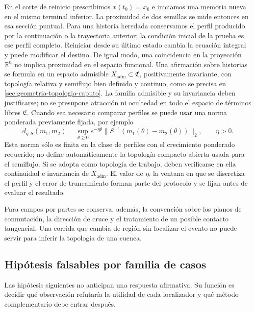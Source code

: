 En el corte de reinicio prescribimos \(x(t_0)=x_0\) e iniciamos una
memoria nueva en el mismo terminal inferior. La proximidad de dos semillas
se mide entonces en esa sección puntual. Para una historia heredada
conservamos el perfil producido por la continuación o la trayectoria
anterior; la condición inicial de la prueba es ese perfil completo.
Reiniciar desde su último estado cambia la ecuación integral y puede
modificar el destino. De igual
modo, una coincidencia en la proyección \(\mathbb R^n\) no implica proximidad
en el espacio funcional. Una afirmación sobre historias se formula en un
espacio admisible \(X_{\mathrm{adm}}\subset\mathfrak C\), positivamente
invariante, con topología relativa y semiflujo bien definido y continuo, como
se precisa en \cref{sec:geometria-topologia-caputo}. La familia admisible y
su invariancia deben justificarse; no se presupone atracción ni ocultedad en
todo el espacio de términos libres \(\mathfrak C\). Cuando sea necesario
comparar perfiles se puede usar una norma ponderada previamente fijada, por ejemplo
\begin{equation}
 d_{\eta,S}(m_1,m_2)=
 \sup_{\theta\geq0}e^{-\eta\theta}
 \lVert S^{-1}(m_1(\theta)-m_2(\theta))\rVert_2,
 \qquad \eta>0.
 \label{camp:eq-history-distance}
\end{equation}
Esta norma sólo es finita en la clase de perfiles con el crecimiento
ponderado requerido; no define automáticamente la topología compacto-abierta
usada para el semiflujo. Si se adopta como topología de trabajo, deben
verificarse en ella continuidad e invariancia de \(X_{\mathrm{adm}}\).
El valor de \(\eta\), la ventana en que se discretiza el perfil y el error de
truncamiento forman parte del protocolo y se fijan antes de evaluar el
resultado.

Para campos por partes se conserva, además, la convención sobre los planos
de conmutación, la dirección de cruce y el tratamiento de un posible contacto
tangencial. Una corrida que cambia de región sin localizar el evento no puede
servir para inferir la topología de una cuenca.

\subsection{Hipótesis falsables por familia de casos}
\label{camp:hipotesis-casos}

Las hipótesis siguientes no anticipan una respuesta afirmativa. Su función es
decidir qué observación refutaría la utilidad de cada localizador y qué método
complementario debe entrar después.

